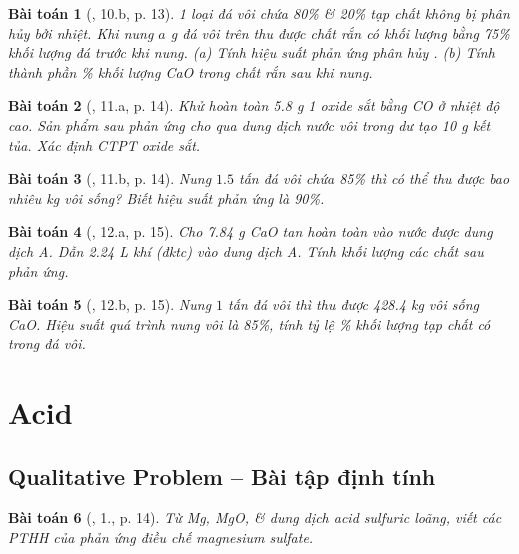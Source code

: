 \documentclass{article}
\newtheorem{baitoan}{Bài toán}
\begin{document}
\begin{baitoan}[\cite{An_350_BT_Hoa_Hoc_9}, 10.b, p. 13]
	1 loại đá vôi chứa \emph{80\% } \& \emph{20\%} tạp chất không bị phân hủy bởi nhiệt. Khi nung $a$ \emph{g} đá vôi trên thu được chất rắn có khối lượng bằng \emph{75\%} khối lượng đá trước khi nung. (a) Tính hiệu suất phản ứng phân hủy \emph{}. (b) Tính thành phần \% khối lượng \emph{CaO} trong chất rắn sau khi nung.
\end{baitoan}

\begin{baitoan}[\cite{An_350_BT_Hoa_Hoc_9}, 11.a, p. 14]
	Khử hoàn toàn \emph{5.8 g} 1 oxide sắt bằng \emph{CO} ở nhiệt độ cao. Sản phẩm sau phản ứng cho qua dung dịch nước vôi trong dư tạo \emph{10 g} kết tủa. Xác định CTPT oxide sắt.
\end{baitoan}

\begin{baitoan}[\cite{An_350_BT_Hoa_Hoc_9}, 11.b, p. 14]
	Nung $1.5$ tấn đá vôi chứa \emph{85\% } thì có thể thu được bao nhiêu \emph{kg} vôi sống? Biết hiệu suất phản ứng là \emph{90\%}.
\end{baitoan}

\begin{baitoan}[\cite{An_350_BT_Hoa_Hoc_9}, 12.a, p. 15]
	Cho \emph{7.84 g CaO} tan hoàn toàn vào nước được dung dịch A. Dẫn \emph{2.24 L} khí \emph{} (đktc) vào dung dịch A. Tính khối lượng các chất sau phản ứng.
\end{baitoan}

\begin{baitoan}[\cite{An_350_BT_Hoa_Hoc_9}, 12.b, p. 15]
	Nung $1$ tấn đá vôi thì thu được \emph{428.4 kg} vôi sống \emph{CaO}. Hiệu suất quá trình nung vôi là \emph{85\%}, tính tỷ lệ \emph{\%} khối lượng tạp chất có trong đá vôi.
\end{baitoan}


\section{Acid}

\subsection{Qualitative Problem -- Bài tập định tính}

\begin{baitoan}[\cite{SGK_Hoa_Hoc_9}, 1., p. 14]
	Từ \emph{Mg, MgO, } \& dung dịch acid sulfuric loãng, viết các PTHH của phản ứng điều chế magnesium sulfate.
\end{baitoan}
\end{document}
